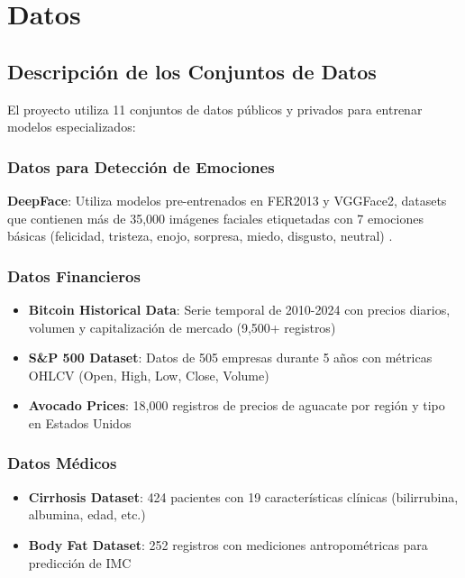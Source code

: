 
\chapter{Datos}
\label{chap:data}
\pagestyle{fancy}

\section{Descripción de los Conjuntos de Datos}

El proyecto utiliza 11 conjuntos de datos públicos y privados para entrenar modelos especializados:

\subsection{Datos para Detección de Emociones}

\textbf{DeepFace}: Utiliza modelos pre-entrenados en FER2013 y VGGFace2, datasets que contienen más de 35,000 imágenes faciales etiquetadas con 7 emociones básicas (felicidad, tristeza, enojo, sorpresa, miedo, disgusto, neutral) \cite{goodfellow2013fer2013}.

\subsection{Datos Financieros}

\begin{itemize}
    \item \textbf{Bitcoin Historical Data}: Serie temporal de 2010-2024 con precios diarios, volumen y capitalización de mercado (9,500+ registros)
    \item \textbf{S\&P 500 Dataset}: Datos de 505 empresas durante 5 años con métricas OHLCV (Open, High, Low, Close, Volume)
    \item \textbf{Avocado Prices}: 18,000 registros de precios de aguacate por región y tipo en Estados Unidos
\end{itemize}

\subsection{Datos Médicos}

\begin{itemize}
    \item \textbf{Cirrhosis Dataset}: 424 pacientes con 19 características clínicas (bilirrubina, albumina, edad, etc.)
    \item \textbf{Body Fat Dataset}: 252 registros con mediciones antropométricas para predicción de IMC
\end{itemize}

